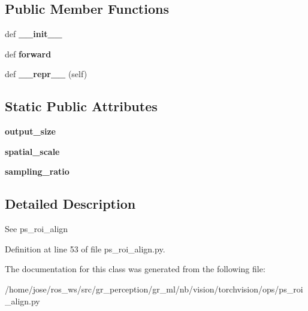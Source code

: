 \subsection*{Public Member Functions}
\begin{DoxyCompactItemize}
\item 
\mbox{\label{classtorchvision_1_1ops_1_1ps__roi__align_1_1PSRoIAlign_aedaf0147624355a6ab4749574c48cfbd}} 
def {\bfseries \+\_\+\+\_\+init\+\_\+\+\_\+}
\item 
\mbox{\label{classtorchvision_1_1ops_1_1ps__roi__align_1_1PSRoIAlign_a26836ec16059aae6489aa8a9bcd0d426}} 
def {\bfseries forward}
\item 
\mbox{\label{classtorchvision_1_1ops_1_1ps__roi__align_1_1PSRoIAlign_a3eb83b24fb2cc48b090ac80343db1e89}} 
def {\bfseries \+\_\+\+\_\+repr\+\_\+\+\_\+} (self)
\end{DoxyCompactItemize}
\subsection*{Static Public Attributes}
\begin{DoxyCompactItemize}
\item 
\mbox{\label{classtorchvision_1_1ops_1_1ps__roi__align_1_1PSRoIAlign_a5bdd06aee483ca14b0f18c33ad9e8046}} 
{\bfseries output\+\_\+size}
\item 
\mbox{\label{classtorchvision_1_1ops_1_1ps__roi__align_1_1PSRoIAlign_a3a3bc32ebc850faf49dafadda02c6497}} 
{\bfseries spatial\+\_\+scale}
\item 
\mbox{\label{classtorchvision_1_1ops_1_1ps__roi__align_1_1PSRoIAlign_a555a674e9607f8310235541d8c7abd53}} 
{\bfseries sampling\+\_\+ratio}
\end{DoxyCompactItemize}


\subsection{Detailed Description}
\begin{DoxyVerb}See ps_roi_align
\end{DoxyVerb}
 

Definition at line 53 of file ps\+\_\+roi\+\_\+align.\+py.



The documentation for this class was generated from the following file\+:\begin{DoxyCompactItemize}
\item 
/home/jose/ros\+\_\+ws/src/gr\+\_\+perception/gr\+\_\+ml/nb/vision/torchvision/ops/ps\+\_\+roi\+\_\+align.\+py\end{DoxyCompactItemize}
